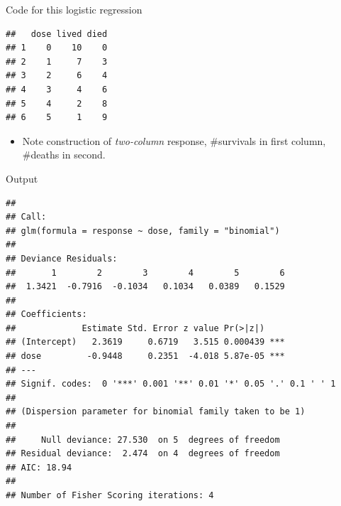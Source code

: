 \begin{frame}[fragile]{Code for this logistic regression}

 
\begin{knitrout}
\color{fgcolor}\begin{kframe}
\begin{alltt}
\hlkwb{=}\hlstd{(}\hlstd{,}
\end{alltt}
\begin{verbatim}
##   dose lived died
## 1    0    10    0
## 2    1     7    3
## 3    2     6    4
## 4    3     4    6
## 5    4     2    8
## 6    5     1    9
\end{verbatim}
\begin{alltt}
\hlkwb{=}
\hlkwb{=}\hlopt{~}\hlstd{=}\hlstd{)}
\end{alltt}
\end{kframe}
\end{knitrout}
  
\begin{itemize}
\item Note construction of \emph{two-column} response, \#survivals in
  first column, \#deaths in second.
\end{itemize}


  
\end{frame}

\begin{frame}[fragile]{Output}

{\footnotesize  
 
\begin{knitrout}
\color{fgcolor}\begin{kframe}
\begin{alltt}
\end{alltt}
\begin{verbatim}
## 
## Call:
## glm(formula = response ~ dose, family = "binomial")
## 
## Deviance Residuals: 
##       1        2        3        4        5        6  
##  1.3421  -0.7916  -0.1034   0.1034   0.0389   0.1529  
## 
## Coefficients:
##             Estimate Std. Error z value Pr(>|z|)    
## (Intercept)   2.3619     0.6719   3.515 0.000439 ***
## dose         -0.9448     0.2351  -4.018 5.87e-05 ***
## ---
## Signif. codes:  0 '***' 0.001 '**' 0.01 '*' 0.05 '.' 0.1 ' ' 1
## 
## (Dispersion parameter for binomial family taken to be 1)
## 
##     Null deviance: 27.530  on 5  degrees of freedom
## Residual deviance:  2.474  on 4  degrees of freedom
## AIC: 18.94
## 
## Number of Fisher Scoring iterations: 4
\end{verbatim}
\end{kframe}
\end{knitrout}
}
  

\end{frame}

